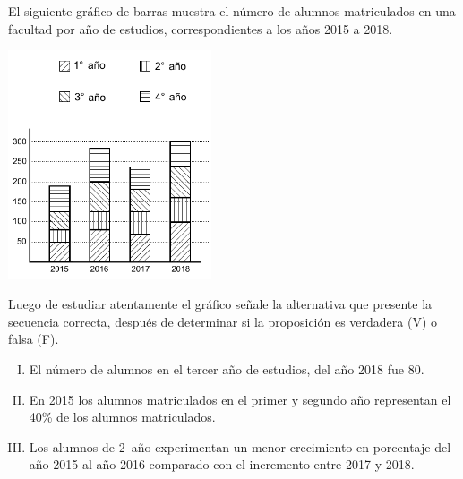 El siguiente gráfico de barras muestra el número de alumnos matriculados en una facultad por año de estudios, correspondientes a los años 2015 a 2018.

\centerline{\includegraphics[width=6cm]{figura}}

Luego de estudiar atentamente el gráfico señale la alternativa que presente la secuencia correcta, después de determinar si la proposición es verdadera (V) o falsa (F).
\begin{enumerate}[I.]
\item El número de alumnos en el tercer año de estudios, del año 2018 fue 80.
\item En 2015 los alumnos matriculados en el primer y segundo año representan el 40\% de los alumnos matriculados.
\item Los alumnos de 2\textordmasculine\ año experimentan un menor crecimiento en porcentaje del año 2015 al año 2016 comparado con el incremento entre 2017 y 2018.
\end{enumerate}
